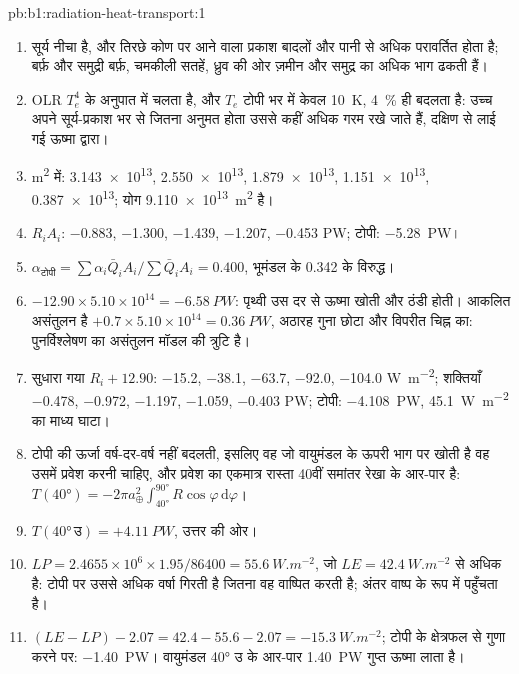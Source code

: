 \begin{solution}{pb:b1:radiation-heat-transport:1}
\begin{enumerate}
  \item सूर्य नीचा है, और तिरछे कोण पर आने वाला प्रकाश बादलों और पानी से अधिक परावर्तित होता है; बर्फ़ और समुद्री बर्फ़, चमकीली सतहें, ध्रुव की ओर ज़मीन और समुद्र का अधिक भाग ढकती हैं।
  \item OLR $T_e^4$ के अनुपात में चलता है, और $T_e$ टोपी भर में केवल \qty{10}{K}, \qty{4}{\percent} ही बदलता है: उच्च  अपने सूर्य-प्रकाश भर से जितना अनुमत होता उससे कहीं अधिक गरम रखे जाते हैं, दक्षिण से लाई गई ऊष्मा द्वारा।
  \item \unit{m^2} में: \num{3.143e13}, \num{2.550e13}, \num{1.879e13},
        \num{1.151e13}, \num{0.387e13}; योग \qty{9.110e13}{m^2} है।
  \item $R_iA_i$: \num{-0.883}, \num{-1.300}, \num{-1.439}, \num{-1.207},
        \num{-0.453} \unit{PW}; टोपी: \qty{-5.28}{PW}।
  \item $\alpha_\text{टोपी} = \sum\alpha_i\bar Q_iA_i/\sum\bar Q_iA_i = 0.400$,
        भूमंडल के \num{0.342} के विरुद्ध।
  \item $-12.90 \times 5.10\times10^{14} = \qty{-6.58}{PW}$: पृथ्वी उस दर से ऊष्मा खोती और ठंडी होती। आकलित असंतुलन है
        $+0.7 \times 5.10\times10^{14} = \qty{+0.36}{PW}$, अठारह गुना छोटा और विपरीत चिह्न का: पुनर्विश्लेषण का असंतुलन मॉडल की त्रुटि है।
  \item सुधारा गया $R_i + 12.90$: \num{-15.2}, \num{-38.1}, \num{-63.7},
        \num{-92.0}, \num{-104.0} \unit{W.m^{-2}}; शक्तियाँ \num{-0.478},
        \num{-0.972}, \num{-1.197}, \num{-1.059}, \num{-0.403} \unit{PW}; टोपी:
        \qty{-4.108}{PW}, \qty{45.1}{W.m^{-2}} का माध्य घाटा।
  \item टोपी की ऊर्जा वर्ष-दर-वर्ष नहीं बदलती, इसलिए वह जो वायुमंडल के ऊपरी भाग पर खोती है वह उसमें प्रवेश करनी चाहिए, और प्रवेश का एकमात्र रास्ता
        40वीं समांतर रेखा के आर-पार है: $T(\ang{40}) = -2\pi a_\oplus^2\int_{\ang{40}}^{\ang{90}}
        R\cos\varphi\,\mathrm d\varphi$।
  \item $T(\ang{40}\,\text{उ}) = +\qty{4.11}{PW}$, उत्तर की ओर।
  \item $LP = 2.4655\times10^6 \times 1.95/86400 = \qty{55.6}{W.m^{-2}}$, जो
        $LE = \qty{42.4}{W.m^{-2}}$ से अधिक है: टोपी पर उससे अधिक वर्षा गिरती है जितना वह वाष्पित करती है; अंतर वाष्प के रूप में पहुँचता है।
  \item $(LE - LP) - 2.07 = 42.4 - 55.6 - 2.07 = \qty{-15.3}{W.m^{-2}}$; टोपी के क्षेत्रफल से गुणा करने पर: \qty{-1.40}{PW}। वायुमंडल \ang{40} उ के आर-पार \qty{1.40}{PW} गुप्त ऊष्मा लाता है।

\end{enumerate}
\end{solution}
